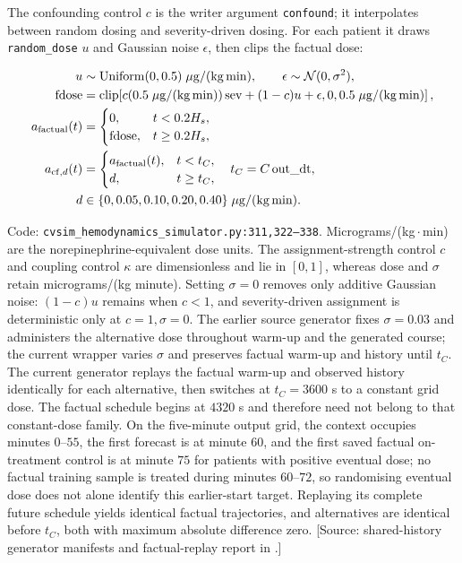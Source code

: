 The confounding control \(c\) is the writer argument \texttt{confound}; it interpolates between random dosing and severity-driven dosing. For each patient it draws \texttt{random\_\allowbreak{}dose} \(u\) and Gaussian noise \(\epsilon\), then clips the factual dose:

\[
\begin{aligned}
u&\sim\operatorname{Uniform}(0,0.5)\;\mathrm{\mu g/(kg\,min)},\qquad
\epsilon\sim\mathcal N(0,\sigma^2),\\
\mathrm{fdose}&=\operatorname{clip}\!\left[c(0.5\;\mathrm{\mu g/(kg\,min)})\,\mathrm{sev}+(1-c)u+\epsilon,
 0,0.5\;\mathrm{\mu g/(kg\,min)}\right],\\
a_{\rm factual}(t)&=\begin{cases}0,&t<0.2H_s,\\ \mathrm{fdose},&t\ge0.2H_s,\end{cases}\\
a_{{\rm cf},d}(t)&=\begin{cases}a_{\rm factual}(t),&t<t_C,\\d,&t\ge t_C,\end{cases}\quad t_C=C\,\mathrm{out\_dt},\\
d&\in\{0,0.05,0.10,0.20,0.40\}\;\mathrm{\mu g/(kg\,min)}.
\end{aligned}
\]



Code: \texttt{cvsim\_hemodynamics\_simulator.py:311,322--338}. Micrograms/(kg\,$\cdot$\,min) are the norepinephrine-equivalent dose units. The assignment-strength control $c$ and coupling control $\kappa$ are dimensionless and lie in $[0,1]$, whereas dose and $\sigma$ retain micrograms/(kg minute). Setting $\sigma=0$ removes only additive Gaussian noise: $(1-c)u$ remains when $c<1$, and severity-driven assignment is deterministic only at $c=1,\sigma=0$. The earlier source generator fixes $\sigma=0.03$ and administers the alternative dose throughout warm-up and the generated course; the current wrapper varies $\sigma$ and preserves factual warm-up and history until $t_C$. The current generator replays the factual warm-up and observed history identically for each alternative, then switches at $t_C=3600$ s to a constant grid dose. The factual schedule begins at $4320$ s and therefore need not belong to that constant-dose family. On the five-minute output grid, the context occupies minutes $0$--$55$, the first forecast is at minute $60$, and the first saved factual on-treatment control is at minute $75$ for patients with positive eventual dose; no factual training sample is treated during minutes $60$--$72$, so randomising eventual dose does not alone identify this earlier-start target. Replaying its complete future schedule yields identical factual trajectories, and alternatives are identical before $t_C$, both with maximum absolute difference zero. [Source: shared-history generator manifests and factual-replay report in .]

